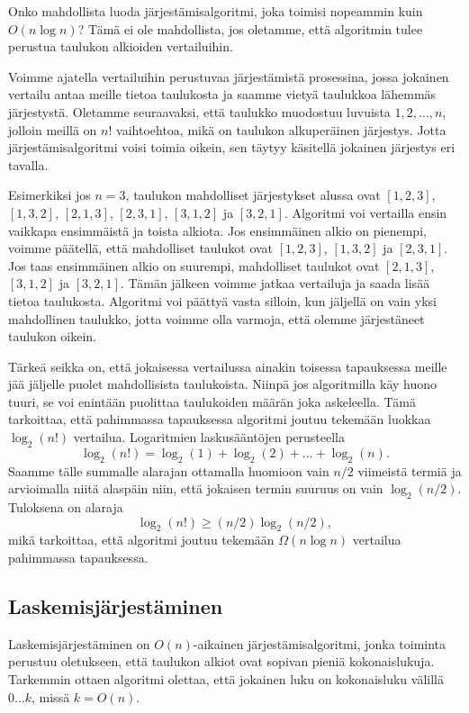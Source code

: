 Onko mahdollista luoda järjestämisalgoritmi, joka toimisi
nopeammin kuin $O(n \log n)$?
Tämä ei ole mahdollista, jos oletamme, että algoritmin
tulee perustua taulukon alkioiden vertailuihin.

Voimme ajatella vertailuihin perustuvaa järjestämistä
prosessina, jossa jokainen vertailu antaa meille tietoa
taulukosta ja saamme vietyä taulukkoa lähemmäs järjestystä.
Oletamme seuraavaksi, että taulukko muodostuu luvuista
$1,2,\dots,n$, jolloin meillä on $n!$ vaihtoehtoa, mikä
on taulukon alkuperäinen järjestys.
Jotta järjestämisalgoritmi voisi toimia oikein,
sen täytyy käsitellä jokainen järjestys eri tavalla.

Esimerkiksi jos $n=3$, taulukon mahdolliset järjestykset alussa ovat
$[1,2,3]$, $[1,3,2]$, $[2,1,3]$, $[2,3,1]$, $[3,1,2]$ ja $[3,2,1]$.
Algoritmi voi vertailla ensin vaikkapa ensimmäistä ja toista alkiota.
Jos ensimmäinen alkio on pienempi, voimme päätellä,
että mahdolliset taulukot ovat $[1,2,3]$, $[1,3,2]$ ja $[2,3,1]$.
Jos taas ensimmäinen alkio on suurempi,
mahdolliset taulukot ovat $[2,1,3]$, $[3,1,2]$ ja $[3,2,1]$.
Tämän jälkeen voimme jatkaa vertailuja ja saada lisää tietoa taulukosta.
Algoritmi voi päättyä vasta silloin, kun jäljellä on vain yksi
mahdollinen taulukko, jotta voimme olla varmoja, että olemme
järjestäneet taulukon oikein.

Tärkeä seikka on, että jokaisessa vertailussa ainakin toisessa
tapauksessa meille jää jäljelle puolet mahdollisista taulukoista.
Niinpä jos algoritmilla käy huono tuuri, se voi enintään puolittaa
taulukoiden määrän joka askeleella.
Tämä tarkoittaa, että pahimmassa tapauksessa algoritmi joutuu
tekemään luokkaa $\log_2(n!)$ vertailua.
Logaritmien laskusääntöjen perusteella
\[
\log_2(n!) = \log_2(1)+\log_2(2)+\dots+\log_2(n).
\]
Saamme tälle summalle alarajan ottamalla huomioon vain
$n/2$ viimeistä termiä ja arvioimalla niitä alaspäin niin, 
että jokaisen termin suuruus on vain $\log_2(n/2)$. Tuloksena on alaraja
\[
\log_2(n!) \ge (n/2) \log_2(n/2),
\]
mikä tarkoittaa, että algoritmi joutuu
tekemään $\Omega(n \log n)$ vertailua pahimmassa tapauksessa.

\subsection{Laskemisjärjestäminen}

Laskemisjärjestäminen on $O(n)$-aikainen järjestämisalgoritmi,
jonka toiminta perustuu oletukseen, että taulukon alkiot
ovat sopivan pieniä kokonaislukuja.
Tarkemmin ottaen algoritmi olettaa, että jokainen luku on
kokonaisluku välillä $0 \dots k$, missä $k=O(n)$.

